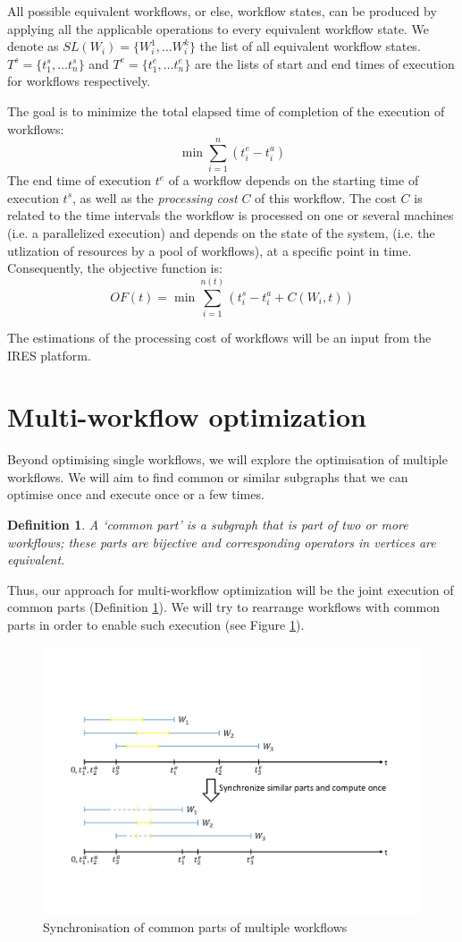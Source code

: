 \documentclass[12pt,openany,onecolumn]{book}
\newtheorem{definition}{Definition}
\begin{document}
All possible equivalent workflows, or else, workflow states, can be produced by applying all the applicable operations to every equivalent workflow state. We denote as $SL(W_i) = \{W^1_i,\ldots W^k_i\}$  the list of all equivalent workflow states.
%
$T^s = \{t^s_1,\ldots t^s_n\}$ and $ T^e = \{t^e_1,\ldots t^e_n\}$ are the lists of start and end times of execution for workflows  respectively.

The goal is to minimize the total elapsed time of completion of the execution of workflows:
$$\min\limits \sum_{i=1}^{n} (t^e_i-t^a_i)$$
The end time of execution $t^e$ of a workflow depends on the starting time of execution $t^s$, as well as the \emph{processing cost} $C$ of this workflow. The cost $C$ is related to the time intervals the workflow is processed on one or several machines (i.e. a parallelized execution) and depends on the state of the system, (i.e. the utlization of resources by a pool of workflows), at a specific point in time. 
Consequently, the objective function is:
$$OF(t) = \min\sum_{i=1}^{n(t)} (t^s_i-t^a_i+C(W_i,t))$$

The estimations of the processing cost of workflows will be an input from the IRES platform.

\section{Multi-workflow optimization}
Beyond optimising single workflows, we will explore the optimisation of multiple workflows. We will aim to find common or similar subgraphs that we can optimise once and execute once or a few times. 

\begin{definition}{A `common part'}
\label{def:commonpart}
is a subgraph that is part of two or more workflows; these parts are bijective and corresponding operators in vertices are equivalent.
\end{definition}

Thus, our approach for multi-workflow optimization will be the joint execution of common parts (Definition \ref{def:commonpart}). We will try to rearrange workflows with common parts in order to enable such execution (see Figure \ref{fig:synccom}). 

\begin{figure}[h]
\centering
\includegraphics[width=0.6\linewidth]{figs/synccommonparts}
\caption{Synchronisation of common parts of multiple workflows}\label{fig:synccom}
\end{figure}
\end{document}
